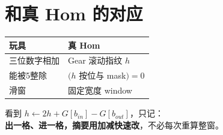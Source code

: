 \section{和真 Hom 的对应}

\begin{center}
\begin{tabular}{@{}ll@{}}
\toprule
玩具 & 真 Hom \\
\midrule
三位数字相加 & Gear 滚动指纹 $h$ \\
能被5整除 & $(h$ 按位与 mask$)=0$ \\
滑窗 & 固定宽度 window \\
\bottomrule
\end{tabular}
\end{center}

\begin{pitfall}[别被公式吓到]
看到 $h\leftarrow 2h+G[b_{in}]-G[b_{out}]$，只记：\\
\textbf{出一格、进一格，摘要用加减快速改}，不必每次重算整窗。
\end{pitfall}
